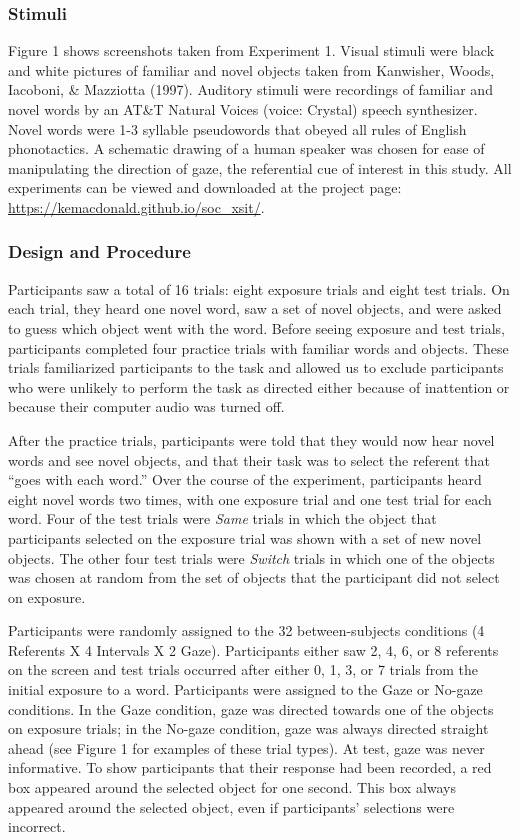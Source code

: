 \documentclass[authoryear, review]{elsarticle}
\begin{document}
\subsubsection{Stimuli}\label{stimuli}

Figure 1 shows screenshots taken from Experiment 1. Visual stimuli were
black and white pictures of familiar and novel objects taken from
Kanwisher, Woods, Iacoboni, \& Mazziotta (1997). Auditory stimuli were
recordings of familiar and novel words by an AT\&T Natural Voices
\texttrademark (voice: Crystal) speech synthesizer. Novel words were 1-3
syllable pseudowords that obeyed all rules of English phonotactics. A
schematic drawing of a human speaker was chosen for ease of manipulating
the direction of gaze, the referential cue of interest in this study.
All experiments can be viewed and downloaded at the project page:
\url{https://kemacdonald.github.io/soc_xsit/}.

\subsubsection{Design and Procedure}\label{design-and-procedure}

Participants saw a total of 16 trials: eight exposure trials and eight
test trials. On each trial, they heard one novel word, saw a set of
novel objects, and were asked to guess which object went with the word.
Before seeing exposure and test trials, participants completed four
practice trials with familiar words and objects. These trials
familiarized participants to the task and allowed us to exclude
participants who were unlikely to perform the task as directed either
because of inattention or because their computer audio was turned off.

After the practice trials, participants were told that they would now
hear novel words and see novel objects, and that their task was to
select the referent that ``goes with each word.'' Over the course of the
experiment, participants heard eight novel words two times, with one
exposure trial and one test trial for each word. Four of the test trials
were \emph{Same} trials in which the object that participants selected
on the exposure trial was shown with a set of new novel objects. The
other four test trials were \emph{Switch} trials in which one of the
objects was chosen at random from the set of objects that the
participant did not select on exposure.

Participants were randomly assigned to the 32 between-subjects
conditions (4 Referents X 4 Intervals X 2 Gaze). Participants either saw
2, 4, 6, or 8 referents on the screen and test trials occurred after
either 0, 1, 3, or 7 trials from the initial exposure to a word.
Participants were assigned to the Gaze or No-gaze conditions. In the
Gaze condition, gaze was directed towards one of the objects on exposure
trials; in the No-gaze condition, gaze was always directed straight
ahead (see Figure 1 for examples of these trial types). At test, gaze
was never informative. To show participants that their response had been
recorded, a red box appeared around the selected object for one second.
This box always appeared around the selected object, even if
participants' selections were incorrect.
\end{document}
